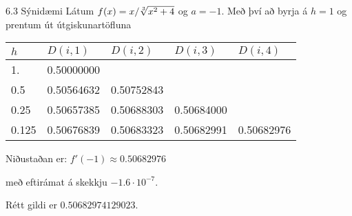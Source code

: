%     
%    


\begin{frame}{6.3 Sýnidæmi} 
Látum $f(x)=x/\root 3 \of{x^2+4}$ og $a=-1$.  
Með því að byrja á $h=1$ og prentum út útgiskunartöfluna

\smallskip
\begin{center}
\begin{tabular}{l|llll}
$h$&$D(i,1)$&$D(i,2)$&$D(i,3)$&$D(i,4)$\\\hline
1.&   0.50000000 \\
0.5&   0.50564632  & 0.50752843\\
0.25&   0.50657385 &  0.50688303 &  0.50684000\\
0.125&   0.50676839 &  0.50683323 &  0.50682991 &  0.50682976
\end{tabular}
\end{center}

Niðustaðan er: $f'(-1)\approx   0.50682976$

með eftirámat á skekkju  $-1.6\cdot 10^{-7}$.  

\smallskip
Rétt gildi er $0.50682974129023$.
\end{frame}

%

